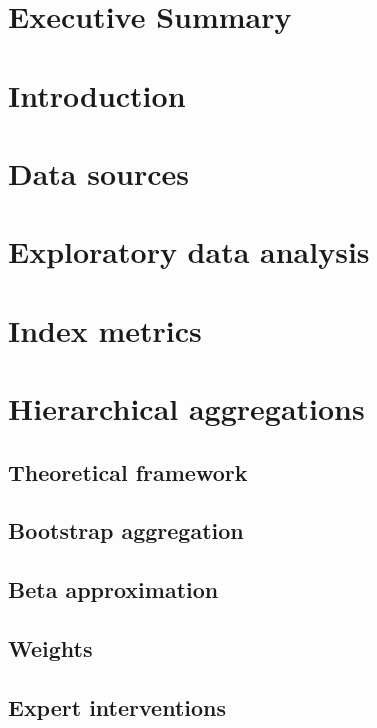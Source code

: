 \documentclass[a4paper]{AIMSreport}
\begin{document}
    
\newcommand{\res}{_small}

\section{Executive Summary}

\section{Introduction}

\section{Data sources}



\section{Exploratory data analysis}


 

\section{Index metrics}


 

\section{Hierarchical aggregations}



\subsection{Theoretical framework}
\subsection{Bootstrap aggregation}                   
\subsection{Beta approximation}
\subsection{Weights}           
\subsection{Expert interventions}
\end{document}
